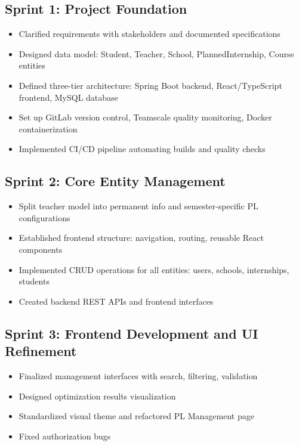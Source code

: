 \documentclass[12pt,a4paper]{report}
\begin{document}
\subsection{Sprint 1: Project Foundation}
\begin{itemize}
    \item Clarified requirements with stakeholders and documented specifications
    \item Designed data model: Student, Teacher, School, PlannedInternship, Course entities
    \item Defined three-tier architecture: Spring Boot backend, React/TypeScript frontend, MySQL database
    \item Set up GitLab version control, Teamscale quality monitoring, Docker containerization
    \item Implemented CI/CD pipeline automating builds and quality checks
\end{itemize}

\subsection{Sprint 2: Core Entity Management}
\begin{itemize}
    \item Split teacher model into permanent info and semester-specific PL configurations
    \item Established frontend structure: navigation, routing, reusable React components
    \item Implemented CRUD operations for all entities: users, schools, internships, students
    \item Created backend REST APIs and frontend interfaces
\end{itemize}

\subsection{Sprint 3: Frontend Development and UI Refinement}
\begin{itemize}
    \item Finalized management interfaces with search, filtering, validation
    \item Designed optimization results visualization
    \item Standardized visual theme and refactored PL Management page
    \item Fixed authorization bugs
\end{itemize}
\end{document}
